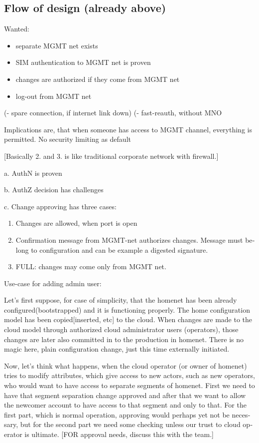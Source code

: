 \documentclass[12pt,a4paper,english]{tutthesis}
\begin{document}
\begin{otherlanguage}{english}
\section{Flow of design (already above)}
\label{sec-4-2}

Wanted: 
\begin{itemize}
\item separate MGMT net exists
\item SIM authentication to MGMT net is proven
\item changes are authorized if they come from MGMT net
\item log-out from MGMT net
\end{itemize}
(- spare connection, if internet link down)
(- fast-reauth, without MNO

Implications are, that when someone has access to MGMT channel,
everything is permitted. No security limiting as default 

[Basically 2. and 3. is like traditional corporate network with firewall.]

a. AuthN is proven

b. AuthZ decision has challenges

c. Change approving has three cases:
\begin{enumerate}
\item Changes are allowed, when port is open
\item Confirmation message from MGMT-net authorizes changes.
Message must belong to configuration and can be example a digested signature.
\item FULL: changes may come only from MGMT net.
\end{enumerate}


Use-case for adding admin user:

Let's first suppose, for case of simplicity, that the homenet has been
already configured(bootstrapped) and it is functioning properly.  The
home configuration model has been copied[inserted, etc] to the cloud.
When changes are made to the cloud model through authorized cloud
administrator users (operators), those changes are later also committed
in to the production in homenet. There is no magic here, plain
configuration change, just this time externally initiated.

Now, let's think what happens, when the cloud operator (or owner of
homenet) tries to modify attributes, which give access to new actors,
such as new operators, who would want to have access to separate
segments of homenet.  First we need to have that segment separation
change approved and after that we want to allow the newcomer account
to have access to that segment and only to that. For the first part,
which is normal operation, approving would perhaps yet not be
necessary, but for the second part we need some checking unless our
trust to cloud operator is ultimate.  [FOR approval needs, discuss
this with the team.]




\end{otherlanguage}
\end{document}
